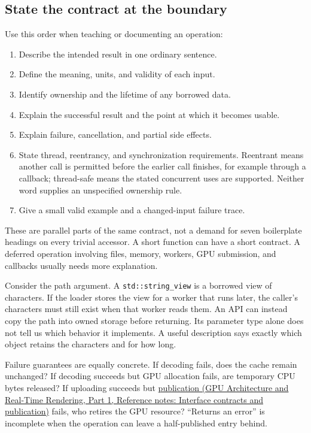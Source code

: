 \subsection{State the contract at the boundary}\label{05-engine-i-ch008-state-the-contract-at-the-boundary}

\hypertarget{05-engine-i-ch008-state-the-contract-at-the-boundary}{}

Use this order when teaching or documenting an operation:

\begin{enumerate}
\def\labelenumi{\arabic{enumi}.}
\tightlist
\item
  Describe the intended result in one ordinary sentence.
\item
  Define the meaning, units, and validity of each input.
\item
  Identify ownership and the lifetime of any borrowed data.
\item
  Explain the successful result and the point at which it becomes usable.
\item
  Explain failure, cancellation, and partial side effects.
\item
  State thread, reentrancy, and synchronization requirements. Reentrant means another call is permitted before the earlier call finishes, for example through a callback; thread-safe means the stated concurrent uses are supported. Neither word supplies an unspecified ownership rule.
\item
  Give a small valid example and a changed-input failure trace.
\end{enumerate}

These are parallel parts of the same contract, not a demand for seven boilerplate headings on every trivial accessor. A short function can have a short contract. A deferred operation involving files, memory, workers, GPU submission, and callbacks usually needs more explanation.

Consider the path argument. A \texttt{std::string\_view} is a borrowed view of characters. If the loader stores the view for a worker that runs later, the caller's characters must still exist when that worker reads them. An API can instead copy the path into owned storage before returning. Its parameter type alone does not tell us which behavior it implements. A useful description says exactly which object retains the characters and for how long.

Failure guarantees are equally concrete. If decoding fails, does the cache remain unchanged? If decoding succeeds but GPU allocation fails, are temporary CPU bytes released? If uploading succeeds but \href{../06-GPU-Architecture-and-Real-Time-Rendering-P01/main.pdf\#nameddest=appendix-fdae7ff0a23f}{publication (GPU Architecture and Real-Time Rendering, Part 1, Reference notes: Interface contracts and publication)} fails, who retires the GPU resource? ``Returns an error'' is incomplete when the operation can leave a half-published entry behind.

